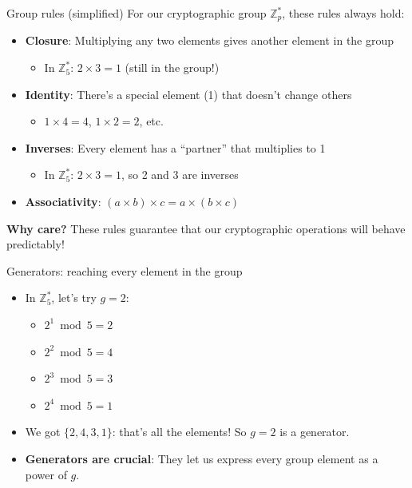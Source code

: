 \ifdefined\PRESENTATION\else\PassOptionsToClass{handout}{beamer}\fi\documentclass[aspectratio=169, lualatex]{beamer}
\begin{document}
\begin{frame}{Group rules (simplified)}
	For our cryptographic group $\mathbb{Z}_p^*$, these rules always hold:
	\begin{itemize}[<+->]
		\item \textbf{Closure}: Multiplying any two elements gives another element in the group
		      \begin{itemize}
			      \item In $\mathbb{Z}_5^*$: $2 \times 3 = 1$ (still in the group!)
		      \end{itemize}
		\item \textbf{Identity}: There's a special element (1) that doesn't change others
		      \begin{itemize}
			      \item $1 \times 4 = 4$, $1 \times 2 = 2$, etc.
		      \end{itemize}
		\item \textbf{Inverses}: Every element has a ``partner'' that multiplies to 1
		      \begin{itemize}
			      \item In $\mathbb{Z}_5^*$: $2 \times 3 = 1$, so 2 and 3 are inverses
		      \end{itemize}
		\item \textbf{Associativity}: $(a \times b) \times c = a \times (b \times c)$
	\end{itemize}
	\vspace{0.5cm}
	\textbf{Why care?} These rules guarantee that our cryptographic operations will behave predictably!
\end{frame}

\begin{frame}{Generators: reaching every element in the group}
	\begin{itemize}[<+->]
		\item In $\mathbb{Z}_5^*$, let's try $g = 2$:
		      \begin{itemize}
			      \item $2^1 \bmod 5 = 2$
			      \item $2^2 \bmod 5 = 4$
			      \item $2^3 \bmod 5 = 3$
			      \item $2^4 \bmod 5 = 1$
		      \end{itemize}
		\item We got $\{2, 4, 3, 1\}$: that's all the elements! So $g = 2$ is a generator.
		\item \textbf{Generators are crucial}: They let us express every group element as a power of $g$.
	\end{itemize}
\end{frame}
\end{document}
